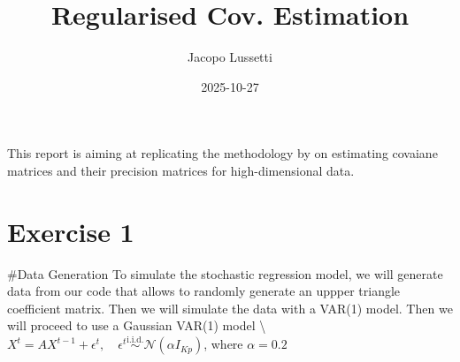 \documentclass[
]{article}
\title{Regularised Cov. Estimation}
\author{Jacopo Lussetti}
\date{2025-10-27}
\begin{document}
\maketitle

This report is aiming at replicating the methodology by
\cite{basu2015regularized} on estimating covaiane matrices and their
precision matrices for high-dimensional data.

\section{Exercise 1}\label{exercise-1}

\#Data Generation To simulate the stochastic regression model, we will
generate data from our code that allows to randomly generate an uppper
triangle coefficient matrix. Then we will simulate the data with a
VAR(1) model. Then we will proceed to use a Gaussian VAR(1) model
\textbackslash{}
\(X^t=AX^{t-1} + \epsilon^t, \quad \epsilon^t \overset{\text{i.i.d.}}{\sim}\mathcal{N}(\alpha I_{Kp})\),
where \(\alpha =0.2\)
\end{document}
